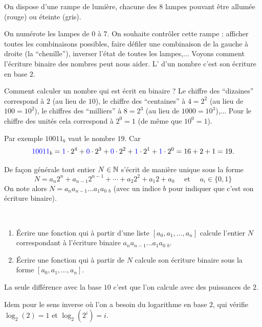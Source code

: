 \documentclass[class=report,crop=false]{standalone}
\begin{document}
On dispose d'une rampe de lumière, chacune des $8$ lampes pouvant être
allumée (rouge) ou éteinte (gris).


On numérote les lampes de $0$ à $7$.
On souhaite contrôler cette rampe : afficher toutes les combinaisons possibles, faire défiler
une combinaison de la gauche à droite (la ``chenille''), inverser l'état de toutes les lampes,...
Voyons comment l'écriture binaire des nombres peut nous aider.
L' d'un nombre c'est son écriture en base $2$.

Comment calculer un nombre qui est écrit en binaire ?
Le chiffre des ``dizaines'' correspond à $2$ (au lieu de $10$),
le chiffre des ``centaines'' à $4=2^2$ (au lieu de $100=10^2$),
le chiffres des ``milliers'' à $8=2^3$ (au lieu de $1000=10^3$),...
Pour le chiffre des unités cela correspond à $2^0 = 1$ (de même que $10^0=1$).

Par exemple $10011_b$ vaut le nombre $19$. Car
$${\color{blue}10011}_b = {\color{blue}1} \cdot 2^4 + {\color{blue}0} \cdot 2^3 +
{\color{blue}0} \cdot 2^2 + {\color{blue}1}\cdot 2^1 + {\color{blue}1}\cdot 2^0 = 16+2+1=19.$$

De façon générale tout entier $N\in \mathbb{N}$ s'écrit de manière unique sous la forme
$$N= a_n 2^n+ a_{n-1}2^{n-1}+\cdots + a_2 2^2 + a_1 2 + a_0 \quad \text{ et } \quad a_i \in \{0,1\}$$
On note alors $N= a_n a_{n-1}\ldots a_1 a_0 \ _b$ (avec un indice $b$ pour indiquer que c'est son écriture binaire).

\begin{tp}~
\begin{enumerate}
  \item \'Ecrire une fonction qui à partir d'une liste $[a_0,a_1,\ldots,a_n]$ calcule l'entier $N$ correspondant à l'écriture binaire
  $a_n a_{n-1}\ldots a_1 a_0 \ _b$.
  \item \'Ecrire une fonction qui à partir de $N$ calcule son écriture binaire sous la forme $[a_0,a_1,\ldots,a_n]$.
\end{enumerate}
\end{tp}

La seule différence avec la base $10$ c'est que l'on calcule avec des puissances de $2$.

Idem pour le sens inverse où l'on a besoin du logarithme en base $2$, qui vérifie
$\log_2(2)=1$ et $\log_2(2^i)=i$.

\end{document}
